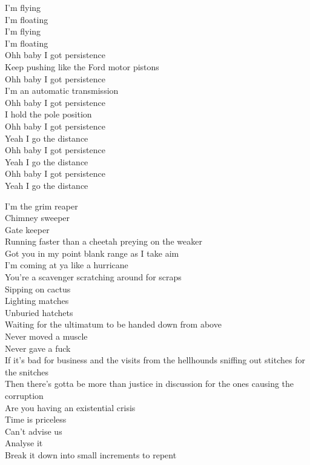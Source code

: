 I'm flying \\
I'm floating \\
I'm flying \\
I'm floating \\

Ohh baby I got persistence \\
Keep pushing like the Ford motor pistons \\
Ohh baby I got persistence \\
I'm an automatic transmission \\
Ohh baby I got persistence \\
I hold the pole position \\
Ohh baby I got persistence \\
Yeah I go the distance \\
Ohh baby I got persistence \\
Yeah I go the distance \\
Ohh baby I got persistence \\
Yeah I go the distance \\




I'm the grim reaper \\
Chimney sweeper \\
Gate keeper \\
Running faster than a cheetah preying on the weaker \\
Got you in my point blank range as I take aim \\
I'm coming at ya like a hurricane \\
You're a scavenger scratching around for scraps \\
Sipping on cactus \\
Lighting matches \\
Unburied hatchets \\
Waiting for the ultimatum to be handed down from above \\
Never moved a muscle \\
Never gave a fuck \\

If it's bad for business and the visits from the hellhounds sniffing out stitches for the snitches \\
Then there's gotta be more than justice in discussion for the ones causing the corruption \\
Are you having an existential crisis \\
Time is priceless \\
Can't advise us \\
Analyse it \\
Break it down into small increments to repent \\

